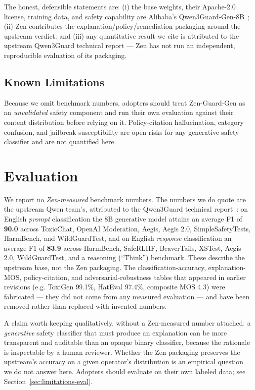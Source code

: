 \documentclass[11pt,a4paper]{article}
\begin{document}
The honest, defensible statements are: (i) the base weights, their Apache-2.0 license,
training data, and safety capability are Alibaba's Qwen3Guard-Gen-8B~\cite{qwen3guard};
(ii) Zen contributes the explanation/policy/remediation packaging around the upstream verdict;
and (iii) any quantitative result we cite is attributed to the upstream Qwen3Guard technical
report --- Zen has not run an independent, reproducible evaluation of its packaging.

\subsection{Known Limitations}

Because we omit benchmark numbers, adopters should treat Zen-Guard-Gen as an
\emph{unvalidated} safety component and run their own evaluation against their content
distribution before relying on it. Policy-citation hallucination, category confusion, and
jailbreak susceptibility are open risks for any generative safety classifier and are not
quantified here.

\section{Evaluation}

We report no \emph{Zen-measured} benchmark numbers. The numbers we do quote are the upstream
Qwen team's, attributed to the Qwen3Guard technical report~\cite{qwen3guard}: on English
\emph{prompt} classification the 8B generative model attains an average F1 of \textbf{90.0}
across ToxicChat, OpenAI Moderation, Aegis, Aegis 2.0, SimpleSafetyTests, HarmBench, and
WildGuardTest, and on English \emph{response} classification an average F1 of \textbf{83.9}
across HarmBench, SafeRLHF, BeaverTails, XSTest, Aegis 2.0, WildGuardTest, and a reasoning
(``Think'') benchmark. These describe the upstream base, not the Zen packaging. The
classification-accuracy, explanation-MOS, policy-citation, and adversarial-robustness tables
that appeared in earlier revisions (e.g. ToxiGen 99.1\%, HatEval 97.4\%, composite MOS 4.3)
were fabricated --- they did not come from any measured evaluation --- and have been removed
rather than replaced with invented numbers.

A claim worth keeping qualitatively, without a Zen-measured number attached: a
\emph{generative} safety classifier that must produce an explanation can be more transparent
and auditable than an opaque binary classifier, because the rationale is inspectable by a human
reviewer. Whether the Zen packaging preserves the upstream's accuracy on a given operator's
distribution is an empirical question we do not answer here. Adopters should evaluate on their
own labeled data; see Section~\ref{sec:limitations-eval}.
\end{document}
